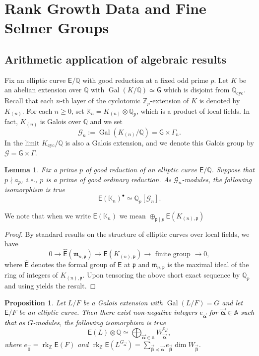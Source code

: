\documentclass{amsart}
\newcommand{\edit}[1]{\textcolor{black}{#1}}
\newtheorem{lemma}[theorem]{Lemma}
\newtheorem{proposition}[theorem]{Proposition}
\numberwithin{equation}{section}
\theoremstyle{remark}
\newcommand{\val}{\vec{\boldsymbol{\alpha}}}
\newcommand{\rk}{\operatorname{rk}}
\newcommand{\EC}{\mathsf{E}}
\newcommand{\fp}{\mathfrak{p}}
\newcommand{\fm}{\mathfrak{m}}
\newcommand{\cG}{\mathcal{G}}
\newcommand{\Gal}{\operatorname{Gal}}
\newcommand{\Qp}{\mathbb{Q}_p}
\newcommand{\sG}{\mathsf{G}}
\newcommand{\Kn}{\mathbb{K}_{n}}
\newcommand{\Zp}{\mathbb{Z}_p}
\newcommand{\Z}{\mathbb{Z}}
\newcommand{\A}{\mathbb{A}}
\newcommand{\Q}{\mathbb{Q}}
\newcommand{\cyc}{\operatorname{{cyc}}}
\theoremstyle{plain} %
\begin{document}
\section{Rank Growth Data and Fine Selmer Groups}
\label{sec: Rank Growth Data and Fine Selmer Groups}

\subsection{Arithmetic application of algebraic results}
Fix an elliptic curve $\EC/\Q$ with good reduction at a fixed odd prime $p$.
Let $K$ be an abelian extension over $\Q$ with $\Gal(K/\Q)\simeq \sG$ which is disjoint from $\Q_{\cyc}$.
Recall that each $n$-th layer of the cyclotomic $\Zp$-extension of $K$ is denoted by $K_{(n)}$.
For each $n\geq 0$, set $\Kn = K_{(n)} \otimes \Qp$, which is a product of local fields.
In fact, $K_{(n)}$ is Galois over $\Q$ and we set
\[
\mathcal{G}_n :=\Gal(K_{(n)}/\Q) = \sG \times \Gamma_n.
\]
In the limit $K_{\cyc}/\Q$ is also a Galois extension, and we denote this Galois group by $\mathcal{G} = \sG \times \Gamma$.


\begin{lemma}
\label{Lemma 1 note 1}
Fix a prime $p$ of good reduction of an elliptic curve $\EC/\Q$.
Suppose that $p\nmid a_p$, i.e., $p$ is a prime of good \emph{ordinary} reduction.
As $\cG_n$-modules, the following isomorphism is true
\[
\EC(\Kn)^{\bullet} \simeq \Qp[\cG_n].
\]
\end{lemma}

We note that when we write $\EC(\Kn)$ we mean $\oplus_{\fp\mid p} \EC(K_{(n),\fp})$

\begin{proof}
By standard results on the structure of elliptic curves over local fields, we have
\[
0 \longrightarrow \hat{\EC}(\fm_{n,\fp}) \longrightarrow \EC(K_{(n),\fp}) \longrightarrow \text{ finite group } \longrightarrow 0,
\]
where $\hat{\EC}$ denotes the formal group of $\EC$ at $\fp$ and $\fm_{n,\fp}$ is the maximal ideal of the ring of integers of $K_{(n),\fp}$.
Upon tensoring the above short exact sequence by $\Qp$ and using \cite[Proposition~VII.6.3]{Sil86} yields the result.
\end{proof}


\begin{proposition}
\label{Prop 2 note 1}
Let $L/F$ be a Galois extension with $\Gal(L/F)=G$ and let $\EC/F$ be an elliptic curve.
\edit{Then there exist non-negative integers $e_{\val}$
for $\val\in \mathbb{A}$ such that a}s $G$-modules, the following isomorphism is true
\[
\EC(L) \otimes \Q \simeq \bigoplus_{\val\in \A} W_{\val}^{e_{\val}},
\]
where $e_{\vec{0}} = \rk_{\Z} \EC(F)$ and $\rk_{\Z} \EC(L^{G_{\val}}) = \sum_{\vec{\boldsymbol{\beta}} \preccurlyeq \val} e_{\vec{\boldsymbol{\beta}}}\dim W_{\vec{\boldsymbol{\beta}}}$.
\end{proposition}
\end{document}
